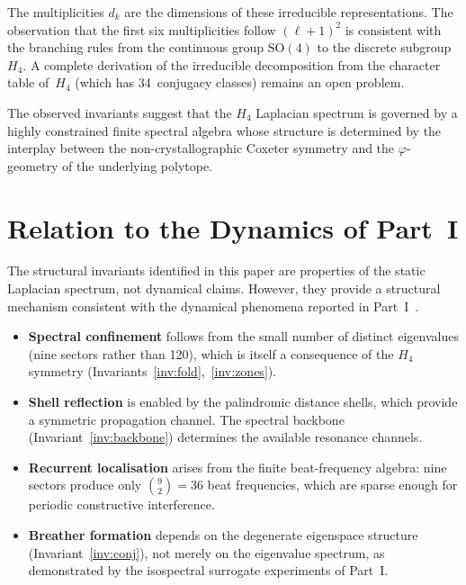 \documentclass[12pt,a4paper]{article}
\newcommand{\Hfour}{H_4}
\newcommand{\vphi}{\varphi}
\begin{document}
The multiplicities $d_k$ are the dimensions of these irreducible
representations.  The observation that the first six multiplicities
follow $(\ell+1)^2$ is consistent with the branching rules from the
continuous group $\mathrm{SO}(4)$ to the discrete subgroup~$\Hfour$.
A complete derivation of the irreducible decomposition from the
character table of~$\Hfour$ (which has 34~conjugacy classes) remains
an open problem.

The observed invariants suggest that the $\Hfour$ Laplacian spectrum
is governed by a highly constrained finite spectral algebra whose
structure is determined by the interplay between the non-crystallographic
Coxeter symmetry and the $\vphi$-geometry of the underlying polytope.


\section{Relation to the Dynamics of Part~I}\label{sec:dynamics}

The structural invariants identified in this paper are properties of
the static Laplacian spectrum, not dynamical claims.  However, they
provide a structural mechanism consistent with the dynamical phenomena
reported in Part~I~\cite{paper1}.

\begin{itemize}[nosep]
\item \textbf{Spectral confinement} follows from the small number of
  distinct eigenvalues (nine sectors rather than 120), which is itself
  a consequence of the $\Hfour$ symmetry
  (Invariants~\ref{inv:fold},~\ref{inv:zones}).

\item \textbf{Shell reflection} is enabled by the palindromic distance
  shells, which provide a symmetric propagation channel.  The spectral
  backbone (Invariant~\ref{inv:backbone}) determines the available
  resonance channels.

\item \textbf{Recurrent localisation} arises from the finite
  beat-frequency algebra: nine sectors produce only $\binom{9}{2} = 36$
  beat frequencies, which are sparse enough for periodic constructive
  interference.

\item \textbf{Breather formation} depends on the degenerate eigenspace
  structure (Invariant~\ref{inv:conj}), not merely on the eigenvalue
  spectrum, as demonstrated by the isospectral surrogate experiments
  of Part~I.
\end{itemize}
\end{document}

